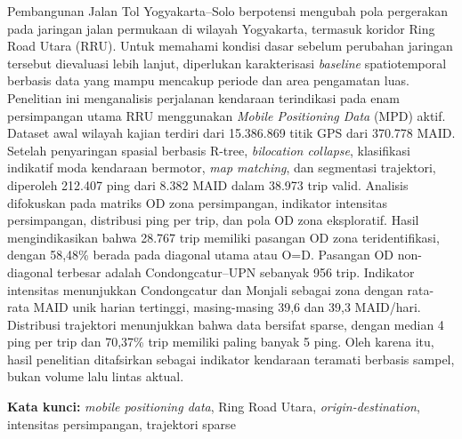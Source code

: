 Pembangunan Jalan Tol Yogyakarta--Solo berpotensi mengubah pola pergerakan pada jaringan jalan permukaan di wilayah Yogyakarta, termasuk koridor Ring Road Utara (RRU). Untuk memahami kondisi dasar sebelum perubahan jaringan tersebut dievaluasi lebih lanjut, diperlukan karakterisasi \textit{baseline} spatiotemporal berbasis data yang mampu mencakup periode dan area pengamatan luas. Penelitian ini menganalisis perjalanan kendaraan terindikasi pada enam persimpangan utama RRU menggunakan \textit{Mobile Positioning Data} (MPD) aktif. Dataset awal wilayah kajian terdiri dari 15.386.869 titik GPS dari 370.778 MAID. Setelah penyaringan spasial berbasis R-tree, \textit{bilocation collapse}, klasifikasi indikatif moda kendaraan bermotor, \textit{map matching}, dan segmentasi trajektori, diperoleh 212.407 ping dari 8.382 MAID dalam 38.973 trip valid. Analisis difokuskan pada matriks OD zona persimpangan, indikator intensitas persimpangan, distribusi ping per trip, dan pola OD zona eksploratif. Hasil mengindikasikan bahwa 28.767 trip memiliki pasangan OD zona teridentifikasi, dengan 58,48\% berada pada diagonal utama atau O=D. Pasangan OD non-diagonal terbesar adalah Condongcatur--UPN sebanyak 956 trip. Indikator intensitas menunjukkan Condongcatur dan Monjali sebagai zona dengan rata-rata MAID unik harian tertinggi, masing-masing 39,6 dan 39,3 MAID/hari. Distribusi trajektori menunjukkan bahwa data bersifat sparse, dengan median 4 ping per trip dan 70,37\% trip memiliki paling banyak 5 ping. Oleh karena itu, hasil penelitian ditafsirkan sebagai indikator kendaraan teramati berbasis sampel, bukan volume lalu lintas aktual.

\textbf{Kata kunci:} \textit{mobile positioning data}, Ring Road Utara, \textit{origin-destination}, intensitas persimpangan, trajektori sparse
